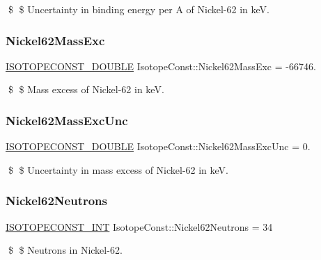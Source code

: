 \$ \$ Uncertainty in binding energy per A of Nickel-\/62 in keV. \mbox{\label{group___isotope_const-_nickel-_ni62_ga24cb31db12c25c55bfe6a8ce0e4ac840}} 
\subsubsection{\texorpdfstring{Nickel62\+Mass\+Exc}{Nickel62MassExc}}
{\footnotesize\ttfamily \mbox{\hyperlink{group___isotope_const-_macros_ga8f45a7272ce02c0b4c65c44636ed719a}{I\+S\+O\+T\+O\+P\+E\+C\+O\+N\+S\+T\+\_\+\+D\+O\+U\+B\+LE}} Isotope\+Const\+::\+Nickel62\+Mass\+Exc = -\/66746.}

\$ \$ Mass excess of Nickel-\/62 in keV. \mbox{\label{group___isotope_const-_nickel-_ni62_ga1981a5830d09d2f6ea6b8ece40324c25}} 
\subsubsection{\texorpdfstring{Nickel62\+Mass\+Exc\+Unc}{Nickel62MassExcUnc}}
{\footnotesize\ttfamily \mbox{\hyperlink{group___isotope_const-_macros_ga8f45a7272ce02c0b4c65c44636ed719a}{I\+S\+O\+T\+O\+P\+E\+C\+O\+N\+S\+T\+\_\+\+D\+O\+U\+B\+LE}} Isotope\+Const\+::\+Nickel62\+Mass\+Exc\+Unc = 0.}

\$ \$ Uncertainty in mass excess of Nickel-\/62 in keV. \mbox{\label{group___isotope_const-_nickel-_ni62_ga72645892b5eeb6092e8605f3f3054e19}} 
\subsubsection{\texorpdfstring{Nickel62\+Neutrons}{Nickel62Neutrons}}
{\footnotesize\ttfamily \mbox{\hyperlink{group___isotope_const-_macros_ga5f18360b3e99483a35c32d789e62621c}{I\+S\+O\+T\+O\+P\+E\+C\+O\+N\+S\+T\+\_\+\+I\+NT}} Isotope\+Const\+::\+Nickel62\+Neutrons = 34}

\$ \$ Neutrons in Nickel-\/62. \mbox{\label{group___isotope_const-_nickel-_ni62_ga9993b7e58ba166660f153c9c0e4b6e11}} 
